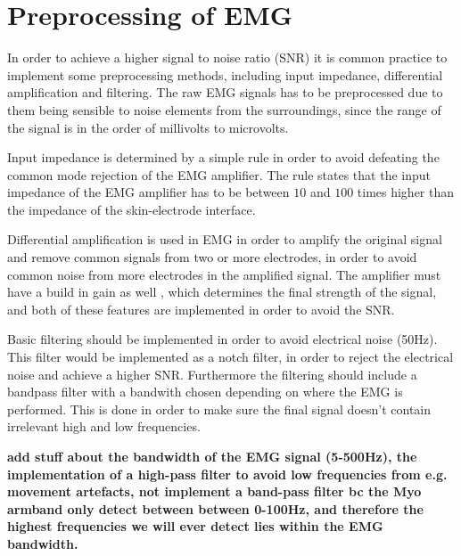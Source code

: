 \section{Preprocessing of EMG}

In order to achieve a higher signal to noise ratio (SNR) it is common practice to implement some preprocessing methods, including input impedance, differential amplification and filtering. The raw EMG signals has to be preprocessed due to them being sensible to noise elements from the surroundings, since the range of the signal is in the order of millivolts to microvolts.\cite{cram2012}

Input impedance is determined by a simple rule in order to avoid defeating the common mode rejection of the EMG amplifier. The rule states that the input impedance of the EMG amplifier has to be between $10$ and $100$ times higher than the impedance of the skin-electrode interface.\cite{cram2012}

Differential amplification is used in EMG in order to amplify the original signal and remove common signals from two or more electrodes, in order to avoid common noise from more electrodes in the amplified signal. The amplifier must have a build in gain as well , which determines the final strength of the signal, and both of these features are implemented in order to avoid the SNR.\cite{cram2012}

Basic filtering should be implemented in order to avoid electrical noise (50Hz). This filter would be implemented as a notch filter, in order to reject the electrical noise and achieve a higher SNR. Furthermore the filtering should include a bandpass filter with a bandwith chosen depending on where the EMG is performed. This is done in order to make sure the final signal doesn't contain irrelevant high and low frequencies.\cite{cram2012}

\textbf{add stuff about the bandwidth of the EMG signal (5-500Hz), the implementation of a high-pass filter to avoid low frequencies from e.g. movement artefacts, not implement a band-pass filter bc the Myo armband only detect between between 0-100Hz, and therefore the highest frequencies we will ever detect lies within the EMG bandwidth.}